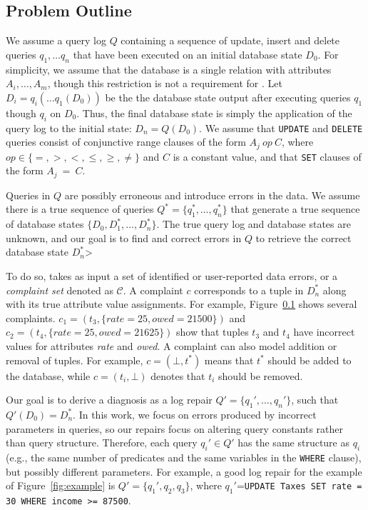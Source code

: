 \subsection{Problem Outline}

We assume a query log $Q$ containing a sequence of update, insert and delete queries 
$q_1, \ldots q_n$  that have been executed on an initial database state $D_0$.  
For simplicity, we assume that the database is a single relation with attributes 
$A_i,\ldots,A_m$, though this restriction is not a requirement for \sys.
Let $D_i = q_i(\ldots q_1(D_0))$ be the the database state output after executing queries $q_1$ though $q_i$ on $D_0$.
Thus, the final database state is simply the application of the query log to
the initial state: $D_n = Q(D_0)$.
We assume that \texttt{UPDATE} and \texttt{DELETE} queries consist of conjunctive range clauses
of the form $A_j\ op\ C$, where $op \in \{=, >, <, \le, \ge, \ne\}$ and $C$ is a constant value,
and that \texttt{SET} clauses of the form $A_j\ =\ C$.

Queries in $Q$ are possibly erroneous and introduce errors in the data.  We assume there is 
a true sequence of queries $Q^* = \{q^*_1,\ldots,q^*_n\}$ that generate a true sequence of database states
$\{D_0, D^*_1,\ldots,D^*_n\}$.  The true query log and database states are unknown, and our goal is to 
find and correct errors in $Q$ to retrieve the correct database state $D^*_n$>

To do so, \sys takes as input a set of identified or user-reported
data errors, or a {\it complaint set} denoted as $\mathcal{C}$. 
A complaint $c$ corresponds to a tuple in $D^*_n$ along with its true attribute value assignments. 
For example, Figure~\ref{} shows several complaints. $c_1 = (t_3, \{rate=25, owed=21500\})$ and 
$c_2 = (t_4, \{rate=25, owed=21625\})$ show that tuples $t_3$ and $t_4$ 
have incorrect values for attributes {\it rate} and {\it owed}.
A complaint can also model addition or removal of tuples. 
For example, $c = (\bot, t^*)$ means that $t^*$ should be added to the database, 
while $c = (t_i, \bot)$ denotes that $t_i$ should be removed.

Our goal is to derive a diagnosis as a log repair
$Q'=\{q_1',\dots, q_n'\}$, such that
$Q'(D_0)=D_n^* $. In this work, we focus on errors produced
by incorrect parameters in queries, so our repairs focus on altering
query constants rather than query structure. Therefore, each query
$q_i'\in Q'$ has the same structure as $q_i$
(e.g., the same number of predicates and the same variables in the \texttt{WHERE} clause), 
but possibly different parameters. For example, a good log repair for the
example of Figure~\ref{fig:example} is
$Q'=\{q_1',q_2,q_3\}$, where $q_1'$=\texttt{UPDATE Taxes
SET rate = 30 WHERE income >= 87500}.


